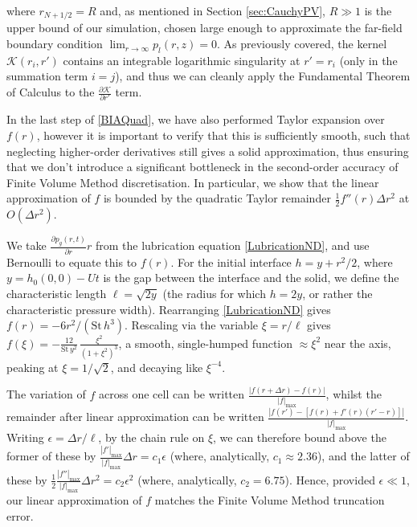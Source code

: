 \documentclass[11pt,a4paper]{article}
\begin{document}
	where $r_{N+1/2} = R$ and, as mentioned in Section \ref{sec:CauchyPV}, $R \gg 1$ is the upper bound of our simulation, chosen large enough to approximate the far-field boundary condition $\lim_{r \to \infty }p_l(r,z) = 0$. As previously covered, the kernel $\mathcal{K}(r_i,r')$ contains an integrable logarithmic singularity at $r' = r_i$ (only in the summation term $i = j$), and thus we can cleanly apply the Fundamental Theorem of Calculus to the $\frac{\partial \mathcal{K}}{\partial r'}$ term.
	
	In the last step of \eqref{BIAQuad}, we have also performed Taylor expansion over $f(r)$, however it is important to verify that this is sufficiently smooth, such that neglecting higher-order derivatives still gives a solid approximation, thus ensuring that we don't introduce a significant bottleneck in the second-order accuracy of Finite Volume Method discretisation. In particular, we show that the linear approximation of $f$ is bounded by the quadratic Taylor remainder $\frac{1}{2}f''(r)\Delta r^2$ at $O(\Delta r^2)$.
	
	We take $\frac{\partial p_g(r,t)}{\partial r} r$ from the lubrication equation \eqref{LubricationND}, and use Bernoulli to equate this to $f(r)$. For the initial interface $h = y + r^2/2$, where $y = h_0(0,0) -Ut$ is the gap between the interface and the solid, we define the characteristic length $\ell = \sqrt{2y}$ (the radius for which $h = 2y$, or rather the characteristic pressure width).
	Rearranging \eqref{LubricationND} gives $f(r)=-6r^2/(\text{St}\,h^3)$. Rescaling via the variable $\xi = r/\ell$ gives $f(\xi)=-\frac{12}{\text{St}\,y^2}\,\frac{\xi^2}{(1+\xi^2)^3}$, a smooth, single-humped function $\approx\xi^2$ near the axis, peaking at $\xi=1/\sqrt2$, and decaying like $\xi^{-4}$.
	
	The variation of $f$ across one cell can be written $\frac{|f(r+\Delta r)-f(r)|}{|f|_{\max}}$, whilst the remainder after linear approximation can be written $\frac{|f(r') - [f(r) + f'(r)(r'-r)]|}{|f|_{\max}}$.	Writing $\epsilon=\Delta r/\ell$, by the chain rule on $\xi$, we can therefore bound above the former of these by $\frac{|f'|_\text{max}}{|f|_\text{max}}\Delta r = c_1\epsilon$ (where, analytically, $c_1 \approx 2.36$), and the latter of these by $\frac{1}{2}\frac{|f''|_\text{max}}{|f|_\text{max}}\Delta r^2 = c_2\epsilon^2$ (where, analytically, $c_2 = 6.75$). Hence, provided $\epsilon \ll 1$, our linear approximation of $f$ matches the Finite Volume Method truncation error.	

	
\end{document}
